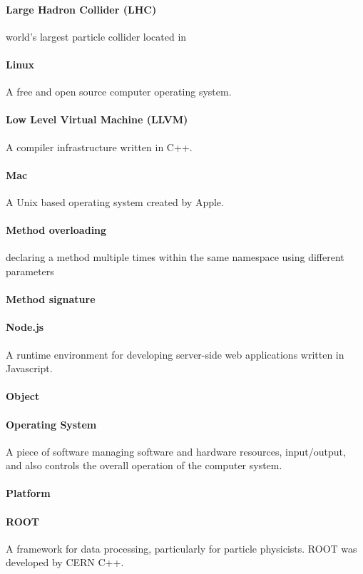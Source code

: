 \paragraph{Large Hadron Collider (LHC)}
world's largest particle collider located in
\paragraph{Linux}
A free and open source computer operating system.
\paragraph{Low Level Virtual Machine (LLVM)}
A compiler infrastructure written in C++.
\paragraph{Mac}
A Unix based operating system created by Apple.
\paragraph{Method overloading}
declaring a method multiple times within the same namespace using different parameters
\paragraph{Method signature}

\paragraph{Node.js}
A runtime environment for developing server-side web applications written in Javascript.

\paragraph{Object}

\paragraph{Operating System}
A piece of software managing software and hardware resources, input/output, and also controls the overall operation of the computer system.
\paragraph{Platform}

\paragraph{ROOT}
A framework for data processing, particularly for particle physicists. ROOT was developed by CERN C++.


